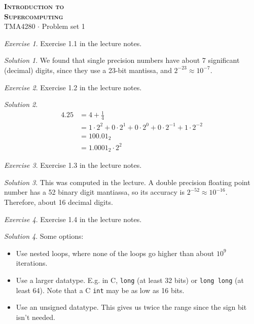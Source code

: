 \documentclass[onecolumn, oneside, a4paper, 11pt]{memoir}
\theoremstyle{remark}
\newtheorem{ex}{Exercise}
\newtheorem*{sol}{Solution}
\begin{document}
\pagestyle{empty}

\begin{center}
  {\Huge \bfseries \scshape
    Introduction to \\[0.2\baselineskip] Supercomputing} \\[2\baselineskip]
  {\Large TMA4280 $\cdot$ Problem set 1} \\[2\baselineskip]
\end{center}

\begin{ex}
  Exercise 1.1 in the lecture notes.
\end{ex}
\begin{sol}
  We found that single precision numbers have about 7 significant (decimal)
  digits, since they use a 23-bit mantissa, and $2^{-23} \approx 10^{-7}$.
\end{sol}

\begin{ex}
  Exercise 1.2 in the lecture notes.
\end{ex}
\begin{sol}
  \begin{align*}
    4.25 &= 4 + \frac{1}{4} \\
         &= 1 \cdot 2^2 + 0 \cdot 2^1 + 0 \cdot 2^0 + 0 \cdot 2^{-1} + 1 \cdot 2^{-2} \\
         &= 100.01_2 \\
         &= 1.0001_2 \cdot 2^2
  \end{align*}
\end{sol}

\begin{ex}
  Exercise 1.3 in the lecture notes.
\end{ex}
\begin{sol}
  This was computed in the lecture. A double precision floating point number has
  a 52 binary digit mantiassa, so its accuracy is $2^{-52} \approx 10^{-16}$.
  Therefore, about 16 decimal digits.
\end{sol}

\begin{ex}
  Exercise 1.4 in the lecture notes.
\end{ex}
\begin{sol}
  Some options:
  \begin{itemize}
  \item Use nested loops, where none of the loops go higher than about $10^9$
    iterations.
  \item Use a larger datatype. E.g. in C, \texttt{long} (at least 32 bits) or
    \texttt{long long} (at least 64). Note that a C \texttt{int} may be as low
    as 16 bits.
  \item Use an unsigned datatype. This gives us twice the range since the sign
    bit isn't needed.
  \end{itemize}
\end{sol}
\end{document}

